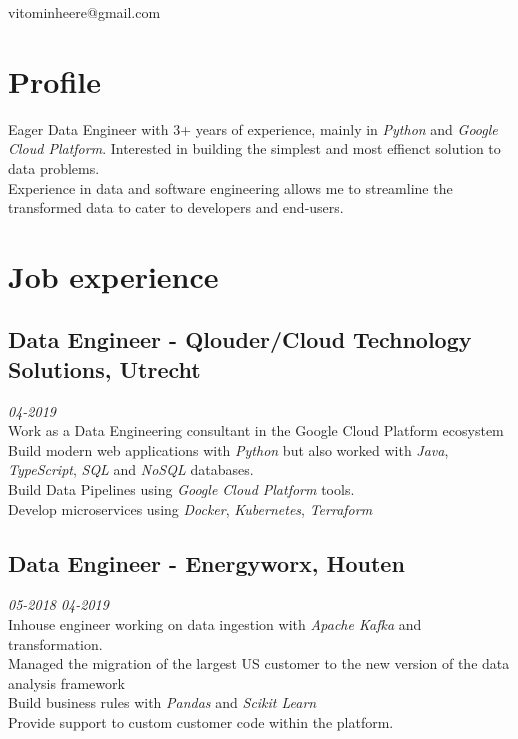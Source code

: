 \documentclass{article}
\makeatletter
\renewcommand{\maketitle}{
\begin{center}
	{\huge\bfseries
	\theauthor}

\vspace*{1cm}
vitominheere@gmail.com

\end{center}
}
\makeatother
\begin{document}
\author{Vito Minheere}


\maketitle

\section{\sc Profile}
Eager Data Engineer with 3+ years of experience, mainly in \emph{Python} and \emph{Google Cloud Platform}. Interested in building the simplest and most effienct solution to data problems. \\
Experience in data and software engineering allows me to streamline the transformed data to cater to developers and end-users.

\section{\sc Job experience}
\subsection{Data Engineer - Qlouder/Cloud Technology Solutions, Utrecht} \hfill {\em 04-2019} \\
Work as a Data Engineering consultant in the Google Cloud Platform ecosystem \\
Build modern web applications with \emph{Python} but also worked with \emph{Java}, \emph{TypeScript}, \emph{SQL} and \emph{NoSQL} databases. \\ 
Build Data Pipelines using \emph{Google Cloud Platform} tools. \\
Develop microservices using \emph{Docker}, \emph{Kubernetes}, \emph{Terraform} \\

\subsection{Data Engineer - Energyworx, Houten} \hfill {\em 05-2018 04-2019} \\
Inhouse engineer working on data ingestion with \emph{Apache Kafka} and transformation. \\
Managed the migration of the largest US customer to the new version of the data analysis framework \\
Build business rules with \emph{Pandas} and \emph{Scikit Learn} \\ 
Provide support to custom customer code within the platform. \\
\end{document}
